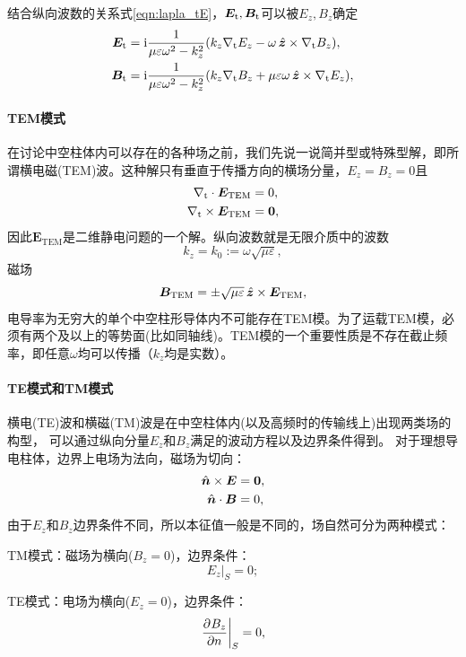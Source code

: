 结合纵向波数的关系式\eqref{eqn:lapla_tE}，$\bm E_\text t,\bm B_\text t$可以被$E_z,B_z$确定
\begin{subequations}
    \label{eqn:EtBt=EzBz}
    \begin{align}
        \label{eqn:Et=EzBz}
        \bm E_\text t&=\mathrm{i}\frac1{\mu\varepsilon\omega^2-k_z^2}(k_z\nabla_\text t E_z-\omega\mathop{}\!\hat{\bm{z}}\times\nabla_\text t B_z),\\
        \label{eqn:Bt=EzBz}
        \bm B_\text t&=\mathrm{i}\frac1{\mu\varepsilon\omega^2-k_z^2}(k_z\nabla_\text t B_z+\mu\varepsilon\omega\mathop{}\!\hat{\bm{z}}\times\nabla_\text t E_z),
    \end{align}
\end{subequations}
\paragraph{TEM模式}
在讨论中空柱体内可以存在的各种场之前，我们先说一说简并型或特殊型解，即所谓横电磁(TEM)波。这种解只有垂直于传播方向的横场分量，$E_z=B_z=0$且
\begin{subequations}
    \begin{align}
        \nabla_\text t\cdot\bm E_\text{TEM}&=0,\\
        \nabla_\text t\times\bm E_\text{TEM}&=\bm 0,
    \end{align}
\end{subequations}
因此$\bm E_\text{TEM}$是二维静电问题的一个解。纵向波数就是无限介质中的波数
\begin{equation}
    \label{eqn:TEM k0}
    k_z=k_0:=\omega\sqrt{\mu\varepsilon},
\end{equation}
磁场 
\[
    \bm B_\text{TEM}=\pm\sqrt{\mu\varepsilon}\mathop{}\!\hat{\bm{z}}\times\bm E_\text{TEM},
\]
电导率为无穷大的单个中空柱形导体内不可能存在TEM模。为了运载TEM模，必须有两个及以上的等势面(比如同轴线)。TEM模的一个重要性质是不存在截止频率，即任意$\omega$均可以传播（$k_z$均是实数）。
\paragraph{TE模式和TM模式}
横电(TE)波和横磁(TM)波是在中空柱体内(以及高频时的传输线上)出现两类场的构型，
可以通过纵向分量$E_z$和$B_z$满足的波动方程以及边界条件得到。
对于理想导电柱体，边界上电场为法向，磁场为切向：
\begin{subequations}
    \begin{align}
        \mathop{}\!\hat{\bm{n}}\times\bm E&=\bm0,\\
        \mathop{}\!\hat{\bm{n}}\cdot\bm B&=0,
    \end{align}
\end{subequations}
由于$E_z$和$B_z$边界条件不同，所以本征值一般是不同的，场自然可分为两种模式：
\begin{compactitem}
	\item TM模式：磁场为横向($B_z=0$)，边界条件：
    \begin{equation}
        E_z|_S=0;
    \end{equation}
	\item TE模式：电场为横向($E_z=0$)，边界条件：
    \begin{equation}
        \left.\frac{\partial^{{}}B_z}{\partial{n}^{{}}}\right\rvert_S=0,
    \end{equation}
\end{compactitem}
